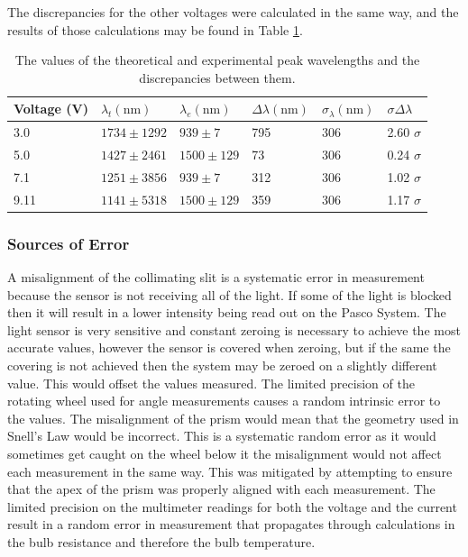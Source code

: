 \documentclass[a4paper]{article}
\begin{document}
\qq The discrepancies for the other voltages were calculated in the same way,
and the results of those calculations may be found in Table
\ref{tab:peakWavelengths}.

\begin{table}[H]
  \caption{The values of the theoretical and experimental peak wavelengths and
    the discrepancies between them.}
  \label{tab:peakWavelengths}
  \begin{center}
    \begin{tabular}{|l|l|l|l|l|l|}
      \hline
      Voltage (\si{\volt}) & \( \lambda_t (\si{\nano\meter}) \) & 
      \( \lambda_e (\si{\nano\meter}) \) & 
      \( \Delta \lambda (\si{\nano\meter}) \) & 
      \( \sigma_{\lambda} (\si{\nano\meter}) \) &
      \( \sigma \Delta \lambda \) \\
      \hline
      3.0 & \( 1734 \pm 1292 \) & \( 939 \pm 7 \) & 795 & 306 & 2.60 \( \sigma
                                                                \) \\
      5.0 & \( 1427 \pm 2461 \) & \( 1500 \pm 129 \) & 73 & 306 & 0.24 \( \sigma
                                                                  \) \\
      7.1 & \( 1251 \pm 3856 \) & \( 939 \pm 7 \) & 312 & 306 & 1.02 \( \sigma
                                                                \) \\
      9.11 & \( 1141 \pm 5318 \) & \( 1500 \pm 129 \) & 359 & 306 & 1.17 \(
                                                                    \sigma \) \\
      \hline
    \end{tabular}
  \end{center}
\end{table}

\subsubsection{Sources of Error}

\qq A misalignment of the collimating slit is a systematic error in
measurement because the sensor is not receiving all of the light. If
some of the light is blocked then it will result in a lower intensity
being read out on the Pasco System. The light sensor is very sensitive
and constant zeroing is necessary to achieve the most accurate values,
however the sensor is covered when zeroing, but if the same the
covering is not achieved then the system may be zeroed on a slightly
different value. This would offset the values measured. The limited
precision of the rotating wheel used for angle measurements causes a
random intrinsic error to the values. The misalignment of the prism
would mean that the geometry used in Snell's Law would be
incorrect. This is a systematic random error as it would sometimes get
caught on the wheel below it the misalignment would not affect each
measurement in the same way. This was mitigated by attempting to
ensure that the apex of the prism was properly aligned with each
measurement. The limited precision on the multimeter readings for both
the voltage and the current result in a random error in measurement
that propagates through calculations in the bulb resistance and
therefore the bulb temperature.
\end{document}
